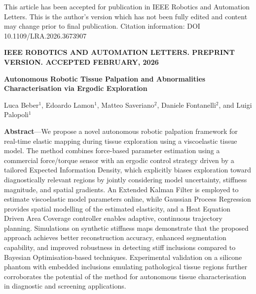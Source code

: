 \documentclass[11pt]{article}
\begin{document}
\begin{center}
\footnotesize
This article has been accepted for publication in IEEE Robotics and
Automation Letters. This is the author's version which has not been
fully edited and content may change prior to final publication.
Citation information: DOI 10.1109/LRA.2026.3673907

\vspace{0.3em}
\textbf{IEEE ROBOTICS AND AUTOMATION LETTERS. PREPRINT VERSION.
ACCEPTED FEBRUARY, 2026}
\end{center}

\vspace{1em}

\begin{center}
{\Large\bfseries Autonomous Robotic Tissue Palpation and Abnormalities
Characterisation via Ergodic Exploration}

\vspace{0.8em}

{\normalsize Luca Beber$^{1}$, Edoardo Lamon$^{1}$,
Matteo Saveriano$^{2}$, Daniele Fontanelli$^{2}$, and
Luigi Palopoli$^{1}$}
\end{center}

\vspace{0.8em}

\noindent\textbf{Abstract}---We propose a novel autonomous robotic
palpation framework for real-time elastic mapping during tissue
exploration using a viscoelastic tissue model. The method combines
force-based parameter estimation using a commercial force/torque
sensor with an ergodic control strategy driven by a tailored Expected
Information Density, which explicitly biases exploration toward
diagnostically relevant regions by jointly considering model
uncertainty, stiffness magnitude, and spatial gradients. An Extended
Kalman Filter is employed to estimate viscoelastic model parameters
online, while Gaussian Process Regression provides spatial modelling
of the estimated elasticity, and a Heat Equation Driven Area Coverage
controller enables adaptive, continuous trajectory planning.
Simulations on synthetic stiffness maps demonstrate that the proposed
approach achieves better reconstruction accuracy, enhanced
segmentation capability, and improved robustness in detecting stiff
inclusions compared to Bayesian Optimisation-based techniques.
Experimental validation on a silicone phantom with embedded inclusions
emulating pathological tissue regions further corroborates the
potential of the method for autonomous tissue characterisation in
diagnostic and screening applications.
\end{document}

